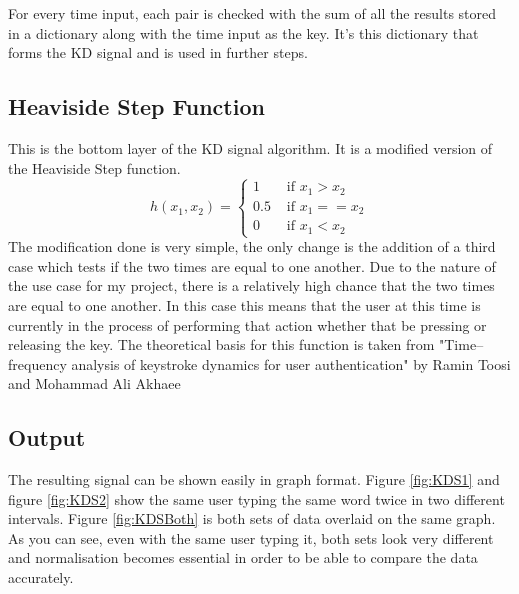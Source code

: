 \documentclass[10pt,a4paper]{report}
\begin{document}
For every time input, each pair is checked with the sum of all the results stored in a dictionary along with the time input as the key. It's this dictionary that forms the KD signal and is used in further steps.

\subsection{Heaviside Step Function}
This is the bottom layer of the KD signal algorithm. It is a modified version of the Heaviside Step function.
\begin{equation}
	h(x_1, x_2) = \begin{cases}
	1 & \text{ if } x_1 > x_2 \\
	0.5 & \text{ if } x_1 == x_2 \\
	0 & \text{ if } x_1 < x_2
\end{cases}
\end{equation}
The modification done is very simple, the only change is the addition of a third case which tests if the two times are equal to one another. Due to the nature of the use case for my project, there is a relatively high chance that the two times are equal to one another. In this case this means that the user at this time is currently in the process of performing that action whether that be pressing or releasing the key. The theoretical basis for this function is taken from "Time–frequency analysis of keystroke dynamics for user authentication" by Ramin Toosi and Mohammad Ali Akhaee\cite{ToosiRamin2021Taok}

\subsection{Output}
The resulting signal can be shown easily in graph format. Figure \ref{fig:KDS1} and figure \ref{fig:KDS2} show the same user typing the same word twice in two different intervals. Figure \ref{fig:KDSBoth} is both sets of data overlaid on the same graph. As you can see, even with the same user typing it, both sets look very different and normalisation becomes essential in order to be able to compare the data accurately. 
\end{document}
